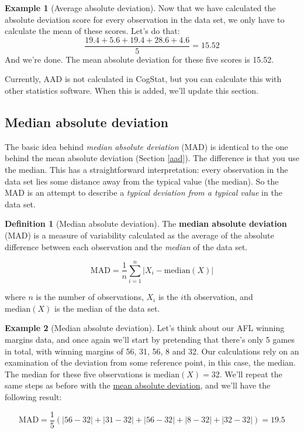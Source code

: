 \documentclass[
]{book}
\theoremstyle{definition}
\newtheorem{definition}{Definition}[chapter]
\theoremstyle{definition}
\newtheorem{example}{Example}[chapter]
\theoremstyle{definition}
\theoremstyle{definition}
\theoremstyle{remark}
\begin{document}
\begin{example}[Average absolute deviation]
Now that we have calculated the absolute deviation score for every observation in the data set, we only have to calculate the mean of these scores. Let's do that:
\[
\frac{19.4 + 5.6 + 19.4 + 28.6 + 4.6}{5} = 15.52
\]
And we're done. The mean absolute deviation for these five scores is 15.52.
\end{example}

Currently, AAD is not calculated in CogStat, but you can calculate this with other statistics software. When this is added, we'll update this section.

\hypertarget{mad}{%
\subsection{Median absolute deviation}\label{mad}}

The basic idea behind \emph{median absolute deviation} (MAD) is identical to the one behind the mean absolute deviation (Section \ref{aad}). The difference is that you use the median. This has a straightforward interpretation: every observation in the data set lies some distance away from the typical value (the median). So the MAD is an attempt to describe a \emph{typical deviation from a typical value} in the data set.

\begin{definition}[Median absolute deviation]
\protect\hypertarget{def:defMAD}{}\label{def:defMAD}The \textbf{median absolute deviation} (MAD) is a measure of variability calculated as the average of the absolute difference between each observation and the \emph{median} of the data set.

\[
\text{MAD} = \frac{1}{n} \sum_{i=1}^n |X_i - \text{median}(X)|
\]

where \(n\) is the number of observations, \(X_i\) is the \(i\)th observation, and \(\text{median}(X)\) is the median of the data set.
\end{definition}

\begin{example}[Median absolute deviation]
\protect\hypertarget{exm:exMAD}{}\label{exm:exMAD}Let's think about our AFL winning margins data, and once again we'll start by pretending that there's only 5 games in total, with winning margins of 56, 31, 56, 8 and 32. Our calculations rely on an examination of the deviation from some reference point, in this case, the median. The median for these five observations is \(\text{median}(X) = 32\). We'll repeat the same steps as before with the \protect\hyperlink{exAAD}{mean absolute deviation}, and we'll have the following result:

\[
\text{MAD} = \frac{1}{5} \left( |56 - 32| + |31 - 32| + |56 - 32| + |8 - 32| + |32 - 32| \right) = 19.5
\]
\end{example}
\end{document}

